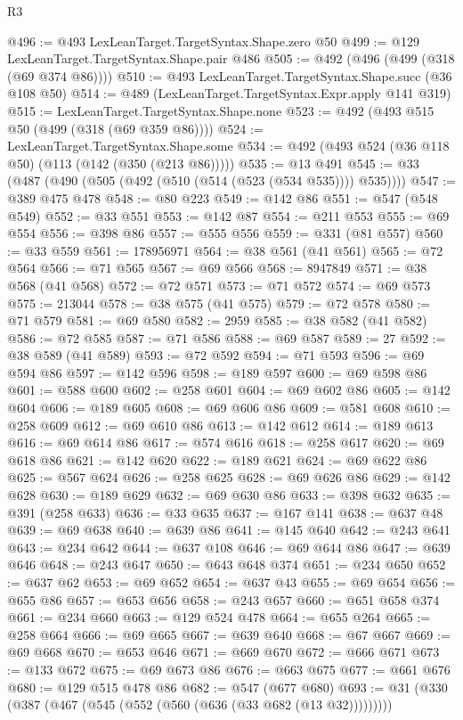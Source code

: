 \begin{lexlean}{R3}
\begin{coremodule}
@496 := @493 LexLeanTarget.TargetSyntax.Shape.zero @50
@499 := @129 LexLeanTarget.TargetSyntax.Shape.pair @486
@505 := @492 (@496 (@499 (@318 (@69 @374 @86))))
@510 := @493 LexLeanTarget.TargetSyntax.Shape.succ (@36 @108 @50)
@514 := @489 (LexLeanTarget.TargetSyntax.Expr.apply @141 @319)
@515 := LexLeanTarget.TargetSyntax.Shape.none
@523 := @492 (@493 @515 @50 (@499 (@318 (@69 @359 @86))))
@524 := LexLeanTarget.TargetSyntax.Shape.some
@534 := @492 (@493 @524 (@36 @118 @50) (@113 (@142 (@350 (@213 @86)))))
@535 := @13 @491
@545 := @33 (@487 (@490 (@505 (@492 (@510 (@514 (@523 (@534 @535)))) @535))))
@547 := @389 @475 @478
@548 := @80 @223
@549 := @142 @86
@551 := @547 (@548 @549)
@552 := @33 @551
@553 := @142 @87
@554 := @211 @553
@555 := @69 @554
@556 := @398 @86
@557 := @555 @556
@559 := @331 (@81 @557)
@560 := @33 @559
@561 := 178956971
@564 := @38 @561 (@41 @561)
@565 := @72 @564
@566 := @71 @565
@567 := @69 @566
@568 := 8947849
@571 := @38 @568 (@41 @568)
@572 := @72 @571
@573 := @71 @572
@574 := @69 @573
@575 := 213044
@578 := @38 @575 (@41 @575)
@579 := @72 @578
@580 := @71 @579
@581 := @69 @580
@582 := 2959
@585 := @38 @582 (@41 @582)
@586 := @72 @585
@587 := @71 @586
@588 := @69 @587
@589 := 27
@592 := @38 @589 (@41 @589)
@593 := @72 @592
@594 := @71 @593
@596 := @69 @594 @86
@597 := @142 @596
@598 := @189 @597
@600 := @69 @598 @86
@601 := @588 @600
@602 := @258 @601
@604 := @69 @602 @86
@605 := @142 @604
@606 := @189 @605
@608 := @69 @606 @86
@609 := @581 @608
@610 := @258 @609
@612 := @69 @610 @86
@613 := @142 @612
@614 := @189 @613
@616 := @69 @614 @86
@617 := @574 @616
@618 := @258 @617
@620 := @69 @618 @86
@621 := @142 @620
@622 := @189 @621
@624 := @69 @622 @86
@625 := @567 @624
@626 := @258 @625
@628 := @69 @626 @86
@629 := @142 @628
@630 := @189 @629
@632 := @69 @630 @86
@633 := @398 @632
@635 := @391 (@258 @633)
@636 := @33 @635
@637 := @167 @141
@638 := @637 @48
@639 := @69 @638
@640 := @639 @86
@641 := @145 @640
@642 := @243 @641
@643 := @234 @642
@644 := @637 @108
@646 := @69 @644 @86
@647 := @639 @646
@648 := @243 @647
@650 := @643 @648 @374
@651 := @234 @650
@652 := @637 @62
@653 := @69 @652
@654 := @637 @43
@655 := @69 @654
@656 := @655 @86
@657 := @653 @656
@658 := @243 @657
@660 := @651 @658 @374
@661 := @234 @660
@663 := @129 @524 @478
@664 := @655 @264
@665 := @258 @664
@666 := @69 @665
@667 := @639 @640
@668 := @67 @667
@669 := @69 @668
@670 := @653 @646
@671 := @669 @670
@672 := @666 @671
@673 := @133 @672
@675 := @69 @673 @86
@676 := @663 @675
@677 := @661 @676
@680 := @129 @515 @478 @86
@682 := @547 (@677 @680)
@693 := @31 (@330 (@387 (@467 (@545 (@552 (@560 (@636 (@33 @682 (@13 @32)))))))))

\end{coremodule}
\end{lexlean}
